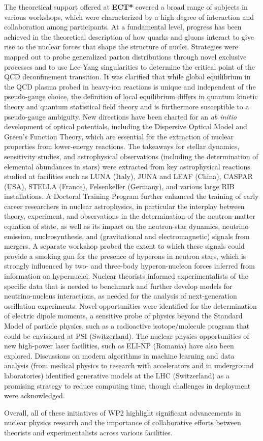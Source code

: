 The theoretical support offered at \textbf{ECT*} covered a broad range of subjects in various workshops, which were characterized by a high degree of interaction and collaboration among participants. At a fundamental level, progress has been achieved in the theoretical description of how quarks and gluons interact to give rise to the nuclear forces that shape the structure of nuclei. Strategies were mapped out to probe generalized parton distributions through novel exclusive processes and to use Lee-Yang singularities to determine the critical point of the QCD deconfinement transition. It was clarified that while global equilibrium in the QCD plasma probed in heavy-ion reactions is unique and independent of the pseudo-gauge choice, the definition of local equilibrium differs in quantum kinetic theory and quantum statistical field theory and is furthermore susceptible to a pseudo-gauge ambiguity. New directions have been charted for an {\it ab initio} development of optical potentials, including the Dispersive Optical Model and Green’s Function Theory, which are essential for the extraction of nuclear properties from lower-energy reactions. The takeaways for stellar dynamics, sensitivity studies, and astrophysical observations (including the determination of elemental abundances in stars) were extracted from key astrophysical reactions studied at facilities such as LUNA (Italy), JUNA and LEAF (China), CASPAR (USA), STELLA (France), Felsenkeller (Germany), and various large RIB installations. A Doctoral Training Program further enhanced the training of early career researchers in nuclear astrophysics, in particular the interplay between theory, experiment, and observations in the determination of the neutron-matter equation of state, as well as its impact on the neutron-star dynamics, neutrino emission, nucleosynthesis, and (gravitational and electromagnetic) signals from mergers. A separate workshop probed the extent to which these signals could provide a smoking gun for the presence of hyperons in neutron stars, which is strongly influenced by two- and three-body hyperon-nucleon forces inferred from information on hypernuclei. Nuclear theorists informed experimentalists of the specific data that is needed to benchmark and further develop models for neutrino-nucleus interactions, as needed for the analysis of next-generation oscillation experiments. Novel opportunities were identified for the determination of electric dipole moments, a sensitive probe of physics beyond the Standard Model of particle physics, such as a radioactive isotope/molecule program that could be envisioned at PSI (Switzerland). The nuclear physics opportunities of new high-power laser facilities, such as ELI-NP (Romania) have also been explored. Discussions on modern algorithms in machine learning and data analysis (from medical physics to research with accelerators and in underground laboratories) identified generative models at the LHC (Switzerland) as a promising strategy to reduce computing time, though challenges in deployment were acknowledged.

Overall, all of these initiatives of WP2 highlight significant advancements in nuclear physics research and the importance of collaborative efforts between theorists and experimentalists across various facilities.